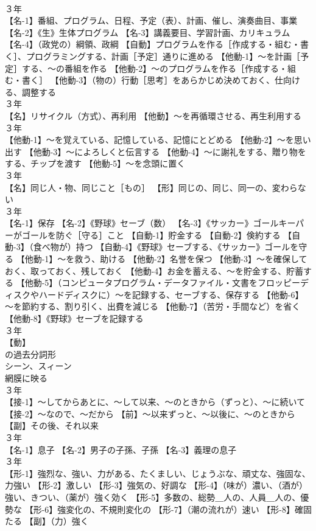 \documentclass[8pt]{extreport}
\begin{document}
\begin{CJK}{UTF8}{min}
\\	３年	
\\	【名-1】番組、プログラム、日程、予定（表）、計画、催し、演奏曲目、事業 【名-2】《生》生体プログラム 【名-3】講義要目、学習計画、カリキュラム 【名-4】（政党の）綱領、政綱 【自動】プログラムを作る［作成する・組む・書く］、プログラミングする、計画［予定］通りに進める 【他動-1】～を計画［予定］する、～の番組を作る 【他動-2】～のプログラムを作る［作成する・組む・書く］ 【他動-3】（物の）行動［思考］をあらかじめ決めておく、仕向ける、調整する
\\	３年	
\\	【名】リサイクル（方式）、再利用 【他動】～を再循環させる、再生利用する
\\	３年	
\\	【他動-1】～を覚えている、記憶している、記憶にとどめる 【他動-2】～を思い出す 【他動-3】～によろしくと伝言する 【他動-4】～に謝礼をする、贈り物をする、チップを渡す 【他動-5】～を念頭に置く
\\	３年	
\\	【名】同じ人・物、同じこと［もの］ 【形】同じの、同じ、同一の、変わらない
\\	３年	
\\	【名-1】保存 【名-2】《野球》セーブ（数） 【名-3】《サッカー》ゴールキーパーがゴールを防ぐ［守る］こと 【自動-1】貯金する 【自動-2】倹約する 【自動-3】（食べ物が）持つ 【自動-4】《野球》セーブする、《サッカー》ゴールを守る 【他動-1】～を救う、助ける 【他動-2】名誉を保つ 【他動-3】～を確保しておく、取っておく、残しておく 【他動-4】お金を蓄える、～を貯金する、貯蓄する 【他動-5】（コンピュータプログラム・データファイル・文書をフロッピーディスクやハードディスクに）～を記録する、セーブする、保存する 【他動-6】～を節約する、割り引く、出費を減じる 【他動-7】（苦労・手間など）を省く 【他動-8】《野球》セーブを記録する
\\	３年	
\\	【動】
\\	の過去分詞形 
\\	シーン、スィーン 
\\	網膜に映る
\\	３年	
\\	【接-1】～してからあとに、～して以来、～のときから（ずっと）、～に続いて 【接-2】～なので、～だから 【前】～以来ずっと、～以後に、～のときから 【副】その後、それ以来
\\	３年	
\\	【名-1】息子 【名-2】男子の子孫、子孫 【名-3】義理の息子
\\	３年	
\\	【形-1】強烈な、強い、力がある、たくましい、じょうぶな、頑丈な、強固な、力強い 【形-2】激しい 【形-3】強気の、好調な 【形-4】（味が）濃い、（酒が）強い、きつい、（薬が）強く効く 【形-5】多数の、総勢＿人の、人員＿人の、優勢な 【形-6】強変化の、不規則変化の 【形-7】（潮の流れが）速い 【形-8】確固たる 【副】（力）強く

\end{CJK}
\end{document}
